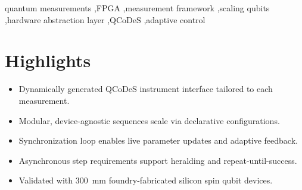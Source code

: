 \documentclass[numbers, preprint, twocolumn,10pt]{elsarticle}
\begin{document}
\begin{frontmatter}
\begin{abstract}
\end{abstract}

\begin{keyword}
quantum measurements \sep FPGA \sep measurement framework \sep scaling qubits \sep hardware abstraction layer \sep QCoDeS \sep adaptive control
\end{keyword}


\end{frontmatter}

\clearpage

\section*{Highlights}
\begin{itemize}
\item Dynamically generated QCoDeS instrument interface tailored to each measurement.
\item Modular, device-agnostic sequences scale via declarative configurations.
\item Synchronization loop enables live parameter updates and adaptive feedback.
\item Asynchronous step requirements support heralding and repeat-until-success.
\item Validated with \SI{300}{\milli\meter} foundry-fabricated silicon spin qubit devices.
\end{itemize}
\end{document}
